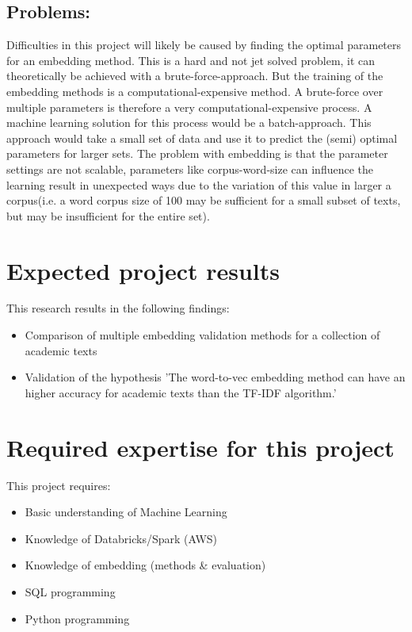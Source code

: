 \documentclass[10pt,a4paper]{article}
\begin{document}
\subsection{Problems:}
Difficulties in this project will likely be caused by finding the optimal parameters for an embedding method. This is a hard and not jet solved problem, it can theoretically be achieved with a brute-force-approach. But the training of the embedding methods is a computational-expensive method. A brute-force over multiple parameters is therefore a very computational-expensive process. A machine learning solution for this process would be a batch-approach. This approach would take a small set of data and use it to predict the (semi) optimal parameters for larger sets. The problem with embedding is that the parameter settings are not scalable, parameters like corpus-word-size can influence the learning result in unexpected ways due to the variation of this value in larger a corpus(i.e. a word corpus size of 100 may be sufficient for a small subset of texts, but may be insufficient for the entire set).


\section{Expected project results}
This research results in the following findings:
\begin{itemize}
\item{Comparison of multiple embedding validation methods for a collection of academic texts}
\item{Validation of the hypothesis 'The word-to-vec embedding method can have an higher accuracy for academic texts than the TF-IDF algorithm.'}
\end{itemize}
\section{Required expertise for this project}
This project requires:
\begin{itemize}
\item{Basic understanding of Machine Learning}
\item{Knowledge of Databricks/Spark (AWS)}
\item{Knowledge of embedding (methods \& evaluation)}
\item{SQL programming}
\item{Python programming}
\end{itemize}
\end{document}
